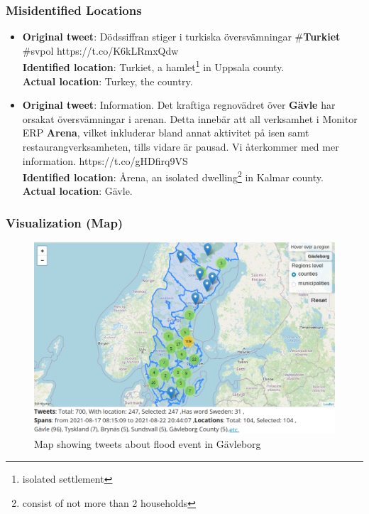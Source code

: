 \documentclass{beamer}
\begin{document}
\begin{frame}[t]
  \frametitle{Misidentified Locations}
\begin{itemize}
  \item \textbf{Original tweet}: Dödssiffran stiger i turkiska översvämningar
    \#\textbf{\alert{Turkiet}} \#svpol
    https://t.co/K6kLRmxQdw \\
    \textbf{Identified location}: Turkiet, a hamlet\footnote{isolated settlement} in Uppsala county. \\
    \textbf{Actual location}: Turkey, the country.

  \item \textbf{Original tweet}: Information. Det kraftiga regnovädret över \textbf{\alert{Gävle}} har orsakat
    översvämningar i arenan. Detta innebär att all verksamhet i Monitor ERP \textbf{\alert{Arena}}, vilket inkluderar
    bland annat aktivitet på isen samt restaurangverksamheten, tills vidare är pausad. Vi återkommer
    med mer information. https://t.co/gHDfirq9VS \\
    \textbf{Identified location}: Årena, an isolated dwelling\footnote{consist of not more than 2 households}
    in Kalmar county. \\
    \textbf{Actual location}: Gävle.
\end{itemize}
\end{frame}
 \begin{frame}[t]
  \frametitle{Visualization (Map)}
\begin{figure}[H]
  \begin{center}
    \includegraphics[height=0.7\textheight]{../report/images/gavle_map.png}
  \end{center}
  \caption{Map showing tweets about flood event in Gävleborg}
\end{figure}
 \end{frame}
\end{document}
